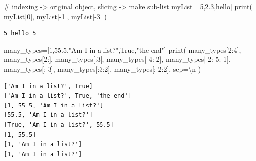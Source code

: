 \documentclass[
  a4paper,
  DIV=11,
  numbers=noendperiod]{scrreprt}
\newenvironment{Shaded}{\begin{snugshade}}{\end{snugshade}}
\newcommand{\BuiltInTok}[1]{\textcolor[rgb]{0.00,0.23,0.31}{#1}}
\newcommand{\CharTok}[1]{\textcolor[rgb]{0.13,0.47,0.30}{#1}}
\newcommand{\CommentTok}[1]{\textcolor[rgb]{0.37,0.37,0.37}{#1}}
\newcommand{\DecValTok}[1]{\textcolor[rgb]{0.68,0.00,0.00}{#1}}
\newcommand{\FloatTok}[1]{\textcolor[rgb]{0.68,0.00,0.00}{#1}}
\newcommand{\NormalTok}[1]{\textcolor[rgb]{0.00,0.23,0.31}{#1}}
\newcommand{\OperatorTok}[1]{\textcolor[rgb]{0.37,0.37,0.37}{#1}}
\newcommand{\StringTok}[1]{\textcolor[rgb]{0.13,0.47,0.30}{#1}}
\newcommand{\VariableTok}[1]{\textcolor[rgb]{0.07,0.07,0.07}{#1}}
\begin{document}
\begin{Shaded}
\begin{Highlighting}[]
\CommentTok{\# indexing {-}\textgreater{} original object, slicing {-}\textgreater{} make sub{-}list}
\NormalTok{myList}\OperatorTok{=}\NormalTok{[}\DecValTok{5}\NormalTok{,}\FloatTok{2.3}\NormalTok{,}\StringTok{\textquotesingle{}hello\textquotesingle{}}\NormalTok{]}
\BuiltInTok{print}\NormalTok{(}
\NormalTok{    myList[}\DecValTok{0}\NormalTok{],}
\NormalTok{    myList[}\OperatorTok{{-}}\DecValTok{1}\NormalTok{],}
\NormalTok{    myList[}\OperatorTok{{-}}\DecValTok{3}\NormalTok{]}
\NormalTok{)}
\end{Highlighting}
\end{Shaded}

\begin{verbatim}
5 hello 5
\end{verbatim}

\begin{Shaded}
\begin{Highlighting}[]
\NormalTok{many\_types}\OperatorTok{=}\NormalTok{[}\DecValTok{1}\NormalTok{,}\FloatTok{55.5}\NormalTok{,}\StringTok{"Am I in a list?"}\NormalTok{,}\VariableTok{True}\NormalTok{,}\StringTok{"the end"}\NormalTok{]}
\BuiltInTok{print}\NormalTok{(}
\NormalTok{    many\_types[}\DecValTok{2}\NormalTok{:}\DecValTok{4}\NormalTok{],}
\NormalTok{    many\_types[}\DecValTok{2}\NormalTok{:],}
\NormalTok{    many\_types[:}\DecValTok{3}\NormalTok{],}
\NormalTok{    many\_types[}\OperatorTok{{-}}\DecValTok{4}\NormalTok{:}\OperatorTok{{-}}\DecValTok{2}\NormalTok{],}
\NormalTok{    many\_types[}\OperatorTok{{-}}\DecValTok{2}\NormalTok{:}\OperatorTok{{-}}\DecValTok{5}\NormalTok{:}\OperatorTok{{-}}\DecValTok{1}\NormalTok{],}
\NormalTok{    many\_types[:}\OperatorTok{{-}}\DecValTok{3}\NormalTok{],}
\NormalTok{    many\_types[:}\DecValTok{3}\NormalTok{:}\DecValTok{2}\NormalTok{],}
\NormalTok{    many\_types[:}\OperatorTok{{-}}\DecValTok{2}\NormalTok{:}\DecValTok{2}\NormalTok{],}
\NormalTok{    sep}\OperatorTok{=}\StringTok{\textquotesingle{}}\CharTok{\textbackslash{}n}\StringTok{\textquotesingle{}}
\NormalTok{)}
\end{Highlighting}
\end{Shaded}

\begin{verbatim}
['Am I in a list?', True]
['Am I in a list?', True, 'the end']
[1, 55.5, 'Am I in a list?']
[55.5, 'Am I in a list?']
[True, 'Am I in a list?', 55.5]
[1, 55.5]
[1, 'Am I in a list?']
[1, 'Am I in a list?']
\end{verbatim}
\end{document}
